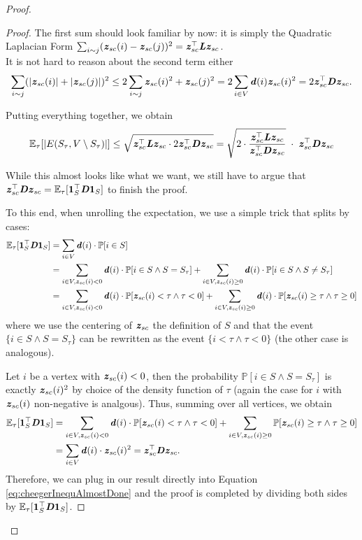 \begin{proof}
\begin{proof}
The first sum should look familiar by now: it is simply the Quadratic Laplacian Form $\sum_{i \sim j} (\boldsymbol{\mathit{z}}_{sc}(i) - \boldsymbol{\mathit{z}}_{sc}(j))^2 = \boldsymbol{\mathit{z}}_{sc}^\top \boldsymbol{\mathit{L}} \boldsymbol{\mathit{z}}_{sc}$. \\

It is not hard to reason about the second term either
\[
\sum_{i \sim j} (|\boldsymbol{\mathit{z}}_{sc}(i)| + |\boldsymbol{\mathit{z}}_{sc}(j)|)^2 \leq 2\sum_{i \sim j} \boldsymbol{\mathit{z}}_{sc}(i)^2 + \boldsymbol{\mathit{z}}_{sc}(j)^2 = 2\sum_{i \in V} \boldsymbol{\mathit{d}}(i) \boldsymbol{\mathit{z}}_{sc}(i)^2 = 2 \boldsymbol{\mathit{z}}_{sc}^{\top} \boldsymbol{\mathit{D}} \boldsymbol{\mathit{z}}_{sc}.
\]

Putting everything together, we obtain
\begin{align}\label{eq:cheegerInequAlmostDone}
   \mathbb{E}_{\tau}[|E(S_{\tau}, V \setminus S_{\tau})|] \leq \sqrt{\boldsymbol{\mathit{z}}_{sc}^\top \boldsymbol{\mathit{L}} \boldsymbol{\mathit{z}}_{sc} \cdot 2 \boldsymbol{\mathit{z}}_{sc}^{\top} \boldsymbol{\mathit{D}} \boldsymbol{\mathit{z}}_{sc}} = \sqrt{2 \cdot \frac{\boldsymbol{\mathit{z}}_{sc}^\top \boldsymbol{\mathit{L}} \boldsymbol{\mathit{z}}_{sc}}{\boldsymbol{\mathit{z}}_{sc}^{\top} \boldsymbol{\mathit{D}} \boldsymbol{\mathit{z}}_{sc}} }\; \cdot \; \boldsymbol{\mathit{z}}_{sc}^{\top} \boldsymbol{\mathit{D}} \boldsymbol{\mathit{z}}_{sc}
\end{align}

While this almost looks like what we want, we still have to argue that $\boldsymbol{\mathit{z}}_{sc}^\top \boldsymbol{\mathit{D}} \boldsymbol{\mathit{z}}_{sc} = \mathbb{E}_{\tau}[\boldsymbol{1}_S^\top \boldsymbol{\mathit{D}} \boldsymbol{1}_S]$ to finish the proof.

To this end, when unrolling the expectation, we use a simple trick that splits by cases:
\begin{align*}
    \mathbb{E}_{\tau}[\boldsymbol{1}_S^\top \boldsymbol{\mathit{D}} \boldsymbol{1}_{S}] &=\sum_{i \in V} \boldsymbol{\mathit{d}}(i) \cdot \mathbb{P}[i \in S] \\
    &=\sum_{i \in V, \boldsymbol{\mathit{z}}_{sc}(i) < 0} \boldsymbol{\mathit{d}}(i) \cdot \mathbb{P}[i \in S \land S=S_{\tau}] + \sum_{i \in V, \boldsymbol{\mathit{z}}_{sc}(i) \geq 0} \boldsymbol{\mathit{d}}(i) \cdot \mathbb{P}[i \in S \land S \neq S_{\tau}]\\
     &=\sum_{i \in V, \boldsymbol{\mathit{z}}_{sc}(i) < 0} \boldsymbol{\mathit{d}}(i) \cdot \mathbb{P}[\boldsymbol{\mathit{z}}_{sc}(i) < \tau \land \tau < 0] + \sum_{i \in V, \boldsymbol{\mathit{z}}_{sc}(i) \geq 0} \boldsymbol{\mathit{d}}(i) \cdot \mathbb{P}[\boldsymbol{\mathit{z}}_{sc}(i) \geq \tau \land \tau \geq 0]
\end{align*}
where we use the centering of $\boldsymbol{\mathit{z}}_{sc}$ the definition of $S$ and that the event $\{i \in S \land S=S_{\tau}\}$ can be rewritten as the event $\{i < \tau \land \tau < 0\}$ (the other case is analogous). 

Let $i$ be a vertex with $\boldsymbol{\mathit{z}}_{sc}(i) < 0$, then the probability $\mathbb{P}[i \in S \land S=S_{\tau}]$ is exactly $\boldsymbol{\mathit{z}}_{sc}(i)^2$ by choice of the density function of $\tau$ (again the case for $i$ with $\boldsymbol{\mathit{z}}_{sc}(i)$ non-negative is analgous). Thus, summing over all vertices, we obtain 
\begin{align*}
    \mathbb{E}_{\tau}[\boldsymbol{1}_S^\top \boldsymbol{\mathit{D}} \boldsymbol{1}_{S}] 
     &=\sum_{i \in V, \boldsymbol{\mathit{z}}_{sc}(i) < 0} \boldsymbol{\mathit{d}}(i) \cdot \mathbb{P}[\boldsymbol{\mathit{z}}_{sc}(i) < \tau \land \tau < 0] + \sum_{i \in V, \boldsymbol{\mathit{z}}_{sc}(i) \geq 0} \mathbb{P}[\boldsymbol{\mathit{z}}_{sc}(i) \geq \tau \land \tau \geq 0]\\
     & = \sum_{i \in V } \boldsymbol{\mathit{d}}(i) \cdot \boldsymbol{\mathit{z}}_{sc}(i)^2 = \boldsymbol{\mathit{z}}_{sc}^\top \boldsymbol{\mathit{D}} \boldsymbol{\mathit{z}}_{sc}.
\end{align*}
Therefore, we can plug in our result directly into Equation 
\ref{eq:cheegerInequAlmostDone} and the proof is completed by dividing both sides by $\mathbb{E}_{\tau}[\boldsymbol{1}_S^\top \boldsymbol{\mathit{D}} \boldsymbol{1}_{S}]$. 
\end{proof}


\end{proof}
